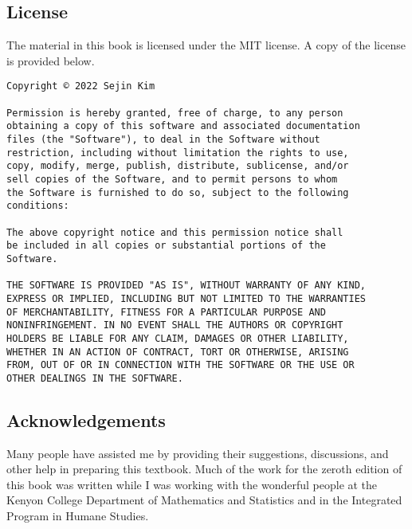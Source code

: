 \subsection*{License}
The material in this book is licensed under the MIT license. A copy of the license is provided below.\par

\begin{verbatim}
Copyright © 2022 Sejin Kim

Permission is hereby granted, free of charge, to any person
obtaining a copy of this software and associated documentation
files (the "Software"), to deal in the Software without
restriction, including without limitation the rights to use,
copy, modify, merge, publish, distribute, sublicense, and/or
sell copies of the Software, and to permit persons to whom
the Software is furnished to do so, subject to the following
conditions:

The above copyright notice and this permission notice shall
be included in all copies or substantial portions of the
Software.

THE SOFTWARE IS PROVIDED "AS IS", WITHOUT WARRANTY OF ANY KIND,
EXPRESS OR IMPLIED, INCLUDING BUT NOT LIMITED TO THE WARRANTIES
OF MERCHANTABILITY, FITNESS FOR A PARTICULAR PURPOSE AND
NONINFRINGEMENT. IN NO EVENT SHALL THE AUTHORS OR COPYRIGHT
HOLDERS BE LIABLE FOR ANY CLAIM, DAMAGES OR OTHER LIABILITY,
WHETHER IN AN ACTION OF CONTRACT, TORT OR OTHERWISE, ARISING
FROM, OUT OF OR IN CONNECTION WITH THE SOFTWARE OR THE USE OR
OTHER DEALINGS IN THE SOFTWARE.
\end{verbatim}
\subsection*{Acknowledgements}
Many people have assisted me by providing their suggestions, discussions, and other help in preparing this textbook. Much of the work for the zeroth edition of this book was written while I was working with the wonderful people at the Kenyon College Department of Mathematics and Statistics and in the Integrated Program in Humane Studies.
